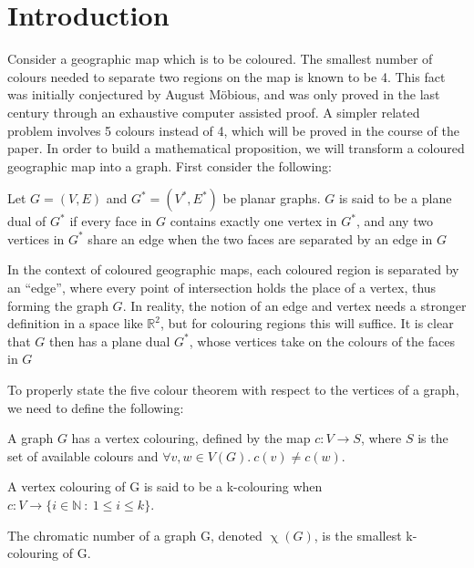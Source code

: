 \section{Introduction}
Consider a geographic map which is to be coloured. The smallest number of colours needed to separate two regions on the map is known to be 4. This fact was initially conjectured by August Möbious, and was only proved in the last century through an exhaustive computer assisted proof. A simpler related problem involves 5 colours instead of 4, which will be proved in the course of the paper. In order to build a mathematical proposition, we will transform a coloured geographic map into a graph. First consider the following:
\begin{definition}
\label{def:plane_dual}
Let $G = (V, E)$ and $G^{*} = (V^{*}, E^{*})$ be planar graphs. $G$ is said to be a plane dual of $G^{*}$ if every face in $G$ contains exactly one vertex in $G^{*}$, and any two vertices in $G^{*}$ share an edge when the two faces are separated by an edge in $G$
\end{definition}
In the context of coloured geographic maps, each coloured region is separated by an ``edge'', where every point of intersection holds the place of a vertex, thus forming the graph $G$. In reality, the notion of an edge and vertex needs a stronger definition in a space like $\mathbb{R}^{2}$, but for colouring regions this will suffice. It is clear that $G$ then has a plane dual $G^{*}$, whose vertices take on the colours of the faces in $G$

To properly state the five colour theorem with respect to the vertices of a graph, we need to define the following:

\begin{definition}
\label{def:vert_col}
A graph $G$ has a vertex colouring, defined by the map $c : V \longrightarrow S$, where $S$ is the set of available colours and $\forall v, w \in V(G). ~ c(v) \not = c(w)$.
\end{definition}

\begin{definition}[k-colouring]
\label{def:k_col}
A vertex colouring of G is said to be a k-colouring when $c : V \longrightarrow \{ i \in \mathbb{N} \ : \ 1 \leq i \leq k \}$.
\end{definition}

\begin{definition}
\label{def:chrom_col}
The chromatic number of a graph G, denoted $\upchi(G)$, is the smallest k-colouring of G.
\end{definition}

